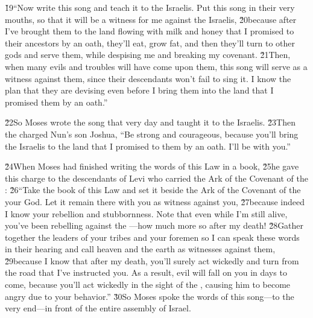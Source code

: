 \v{19}``Now write this song and teach it to the Israelis. Put this song in their very mouths, so that it will be a witness for me against the Israelis, \v{20}because after I've brought them to the land flowing with milk and honey that I promised to their ancestors by an oath, they'll eat, grow fat, and then they'll turn to other gods and serve them, while despising me and breaking my covenant. \v{21}Then, when many evils and troubles will have come upon them, this song will serve as a witness against them, since their descendants won't fail to sing it. I know the plan that they are devising even before I bring them into the land that I promised them by an oath.''

\v{22}So Moses wrote the song that very day and taught it to the Israelis. \v{23}Then the  charged Nun's son Joshua, ``Be strong and courageous, because you'll bring the Israelis to the land that I promised to them by an oath. I'll be with you.''

\v{24}When Moses had finished writing the words of this Law in a book, \v{25}he gave this charge to the descendants of Levi who carried the Ark of the Covenant of the : \v{26}``Take the book of this Law and set it beside the Ark of the Covenant of the  your God. Let it remain there with you as witness against you, \v{27}because indeed I know your rebellion and stubbornness. Note that even while I'm still alive, you've been rebelling against the ---how much more so after my death! \v{28}Gather together the leaders of your tribes and your foremen so I can speak these words in their hearing and call heaven and the earth as witnesses against them, \v{29}because I know that after my death, you'll surely act wickedly and turn from the road that I've instructed you. As a result, evil will fall on you in days to come, because you'll act wickedly in the sight of the , causing him to become angry due to your behavior.'' \v{30}So Moses spoke the words of this song---to the very end---in front of the entire assembly of Israel.

